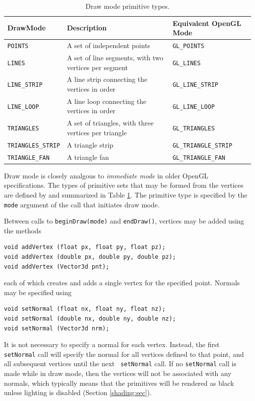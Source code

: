 \begin{table}[h]
\begin{center}
\begin{tabular}{|lll|}
\hline
DrawMode & Description & Equivalent OpenGL Mode\\
\hline
{\tt POINTS} & A set of independent points & {\tt GL\_POINTS} \\
{\tt LINES} & A set of line segments, with two vertices 
per segment & {\tt GL\_LINES}\\
{\tt LINE\_STRIP} & A line strip connecting the vertices in order &
{\tt GL\_LINE\_STRIP}\\
{\tt LINE\_LOOP} & A line loop connecting the vertices in order &
{\tt GL\_LINE\_LOOP}\\
{\tt TRIANGLES} & A set of triangles, with three vertices
per triangle & {\tt GL\_TRIANGLES}\\
{\tt TRIANGLES\_STRIP} & A triangle strip & {\tt GL\_TRIANGLE\_STRIP} \\
{\tt TRIANGLE\_FAN} & A triangle fan &
{\tt GL\_TRIANGLE\_FAN}\\
\hline
\end{tabular}
\end{center}
\caption{Draw mode primitive types.}
\label{DrawMode:tab}
\end{table}

Draw mode is closely analgous to {\it immediate mode} in older
OpenGL specifications. The types of primitive sets that may be formed from
the vertices are defined by
 and summarized in Table
\ref{DrawMode:tab}.
The primitive type is specified by the {\tt mode} argument of the
call that initiates draw mode.

Between calls to {\tt beginDraw(mode)} and {\tt endDraw()}, vertices
may be added using the methods
%
\begin{lstlisting}[]
void addVertex (float px, float py, float pz);
void addVertex (double px, double py, double pz);
void addVertex (Vector3d pnt);
\end{lstlisting}
%
each of which creates and adds a single vertex for the specified
point.
Normals may be specified using
\begin{lstlisting}[]
void setNormal (float nx, float ny, float nz);
void setNormal (double nx, double ny, double nz);
void setNormal (Vector3d nrm);
\end{lstlisting}
%
It is not necessary to specify a normal for each vertex. Instead, the
first {\tt setNormal} call will specify the normal for all vertices
defined to that point, and all subsequent vertices until the next {\tt
setNormal} call. If no {\tt setNormal} call is made while in draw mode,
then the vertices will not be
associated with any normals, which typically means that the primitives
will be rendered as black unless lighting is disabled (Section
\ref{shading:sec}).

